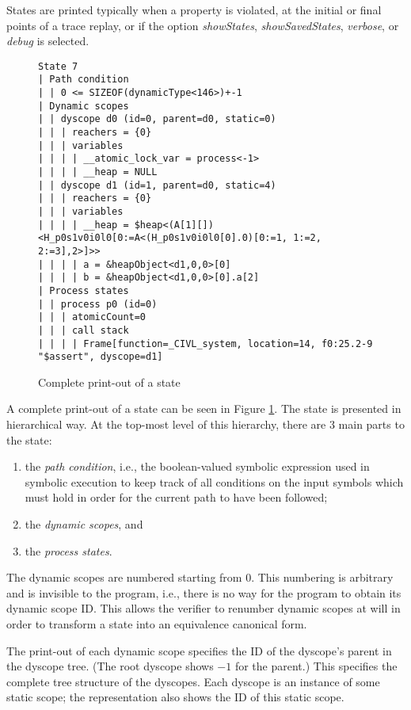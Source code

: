 States are printed typically when a property is violated, at the
initial or final points of a trace replay, or if the option
\emph{showStates}, \emph{showSavedStates}, \emph{verbose}, or
\emph{debug} is selected.

\begin{figure}
  \begin{small}
\begin{verbatim}
State 7
| Path condition
| | 0 <= SIZEOF(dynamicType<146>)+-1
| Dynamic scopes
| | dyscope d0 (id=0, parent=d0, static=0)
| | | reachers = {0}
| | | variables
| | | | __atomic_lock_var = process<-1>
| | | | __heap = NULL
| | dyscope d1 (id=1, parent=d0, static=4)
| | | reachers = {0}
| | | variables
| | | | __heap = $heap<(A[1][])<H_p0s1v0i0l0[0:=A<(H_p0s1v0i0l0[0].0)[0:=1, 1:=2, 2:=3],2>]>>
| | | | a = &heapObject<d1,0,0>[0]
| | | | b = &heapObject<d1,0,0>[0].a[2]
| Process states
| | process p0 (id=0)
| | | atomicCount=0
| | | call stack
| | | | Frame[function=_CIVL_system, location=14, f0:25.2-9 "$assert", dyscope=d1]
\end{verbatim}
  \end{small}
  \caption{Complete print-out of a state}
  \label{fig:state-print}
\end{figure}

A complete print-out of a state can be seen in Figure
\ref{fig:state-print}.  The state is presented in hierarchical way.
At the top-most level of this hierarchy, there are 3 main parts to the
state:
\begin{enumerate}
\item the \emph{path condition}, i.e., the boolean-valued symbolic
  expression used in symbolic execution to keep track of all
  conditions on the input symbols which must hold in order for the
  current path to have been followed;
\item the \emph{dynamic scopes}, and
\item the \emph{process states}.
\end{enumerate}

The dynamic scopes are numbered starting from 0.  This numbering is
arbitrary and is invisible to the program, i.e., there is no way for
the program to obtain its dynamic scope ID.  This allows the verifier
to renumber dynamic scopes at will in order to transform a state into
an equivalence canonical form.

The print-out of each dynamic scope specifies the ID of the dyscope's
parent in the dyscope tree.  (The root dyscope shows $-1$ for the
parent.)  This specifies the complete tree structure of the dyscopes.
Each dyscope is an instance of some static scope; the representation
also shows the ID of this static scope.

